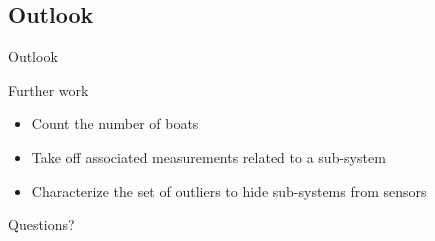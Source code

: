 \documentclass{beamer}
\begin{document}
        \subsection{Outlook}

            \begin{frame}{Outlook}
                \centering
                \begin{minipage}{0.8\textwidth}
                    \begin{block}{Further work}
                        \vspace{0.25cm}
                        \begin{itemize}
                            \item Count the number of boats
                            \item Take off associated measurements related to a sub-system
                            \item Characterize the set of outliers to hide sub-systems from sensors
                        \end{itemize}
                    \end{block}
                \end{minipage}
            \end{frame}
    
    \appendix

    \begin{frame}[standout]
        Questions?
    \end{frame}
    
\end{document}

